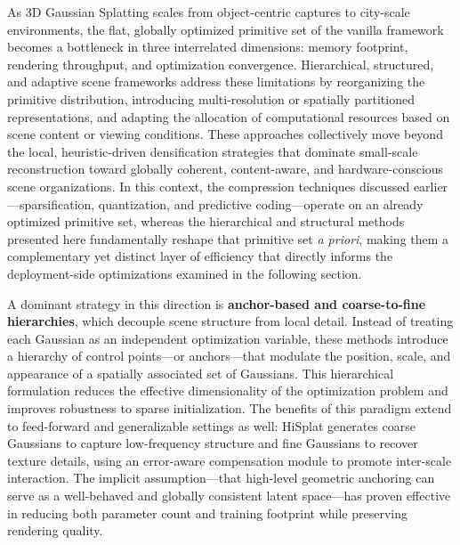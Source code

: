 \documentclass[11pt,a4paper]{article}
\begin{document}
As 3D Gaussian Splatting scales from object-centric captures to city-scale environments, the flat, globally optimized primitive set of the vanilla framework becomes a bottleneck in three interrelated dimensions: memory footprint, rendering throughput, and optimization convergence. Hierarchical, structured, and adaptive scene frameworks address these limitations by reorganizing the primitive distribution, introducing multi-resolution or spatially partitioned representations, and adapting the allocation of computational resources based on scene content or viewing conditions. These approaches collectively move beyond the local, heuristic-driven densification strategies that dominate small-scale reconstruction \cite{arxiv:2505.05587v1,arxiv:2411.12788v2} toward globally coherent, content-aware, and hardware-conscious scene organizations. In this context, the compression techniques discussed earlier---sparsification, quantization, and predictive coding---operate on an already optimized primitive set, whereas the hierarchical and structural methods presented here fundamentally reshape that primitive set \emph{a priori}, making them a complementary yet distinct layer of efficiency that directly informs the deployment-side optimizations examined in the following section.

A dominant strategy in this direction is \textbf{anchor-based and coarse-to-fine hierarchies}, which decouple scene structure from local detail. Instead of treating each Gaussian as an independent optimization variable, these methods introduce a hierarchy of control points---or anchors---that modulate the position, scale, and appearance of a spatially associated set of Gaussians. This hierarchical formulation reduces the effective dimensionality of the optimization problem and improves robustness to sparse initialization. The benefits of this paradigm extend to feed-forward and generalizable settings as well: HiSplat \cite{arxiv:2410.06245v1} generates coarse Gaussians to capture low-frequency structure and fine Gaussians to recover texture details, using an error-aware compensation module to promote inter-scale interaction. The implicit assumption---that high-level geometric anchoring can serve as a well-behaved and globally consistent latent space---has proven effective in reducing both parameter count and training footprint while preserving rendering quality.
\end{document}

